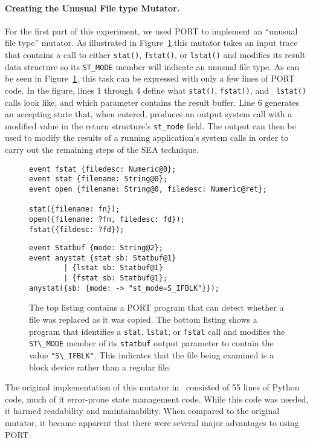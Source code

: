 \paragraph{Creating the Unusual File type Mutator.}
\label{subsub:UnusualFiletype}
For the first part of this experiment,
we used PORT to implement an ``unusual file type''
mutator.
As illustrated in Figure~\ref{lst:SEAListings},this mutator
takes an input trace
that contains a call to either {\tt stat()},
{\tt fstat()},
or {\tt lstat()}
and modifies its result data structure so
its {\tt ST\_MODE} member will indicate an unusual file type.
As can be seen in
Figure~\ref{lst:SEAListings}, this task can be expressed with only a few lines of PORT code.  In the figure,
lines 1 through 4 define what {\tt stat()}, {\tt fstat()}, and {\tt
lstat()} calls look like, and which parameter contains the result buffer.
Line 6 generates an accepting state that, when entered, produces an output
system call with a modified value in the return structure's {\tt st\_mode}
field.  The output can then be used to modify the results of a running
application's system calls in order to carry out the remaining steps of the
SEA technique.

\begin{figure}
\centering
\begin{lstlisting}[basicstyle=\ttfamily\scriptsize]
event fstat {filedesc: Numeric@0};
event stat {filename: String@0};
event open {filename: String@0, filedesc: Numeric@ret};

stat({filename: fn});
open({filename: ?fn, filedesc: fd});
fstat({fildesc: ?fd});
\end{lstlisting}
\begin{lstlisting}[basicstyle=\ttfamily\scriptsize]
event Statbuf {mode: String@2};
event anystat {stat sb: Statbuf@1}
        | {lstat sb: Statbuf@1} 
        | {fstat sb: Statbuf@1};
anystat({sb: {mode: -> "st_mode=S_IFBLK"}});
\end{lstlisting}
\caption{The top listing contains a
PORT program that can detect whether a file was replaced as it was copied.
The bottom listing shows a program that
identifies a \texttt{stat}, \texttt{lstat}, or \texttt{fstat} call and modifies
  the \lstinline+ST\_MODE+ member of its \lstinline+statbuf+ output parameter to contain the value
  \lstinline+"S\_IFBLK"+. This indicates that the file being examined is a block device rather than a regular file.}
\label{lst:SEAListings}
\end{figure}

The original implementation of this mutator in~\cite{DBLP:conf/issre/MooreCFW19} consisted of 55 lines
of Python code, much of it error-prone state management code. While this code was needed, it harmed
readability and maintainability.
When compared to the original mutator, it became apparent that there were
several major advantages
to using
PORT:

